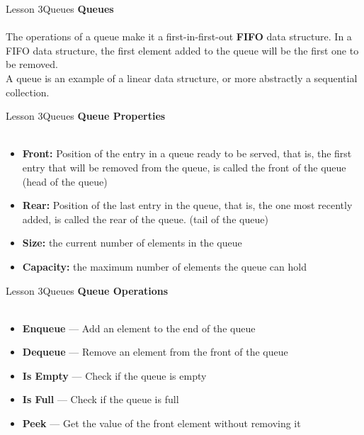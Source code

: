 \documentclass[aspectratio=1610]{beamer}
\begin{document}
\begin{frame}{Lesson 3}{Queues}
\LARGE
\textbf{Queues}\\~\\
The operations of a queue make it a first-in-first-out \textbf{FIFO}
data structure. In a FIFO data structure, the first element added to
the queue will be the first one to be removed.\\
A queue is an example of a linear data structure, or more abstractly
a sequential collection.
\end{frame}


\begin{frame}{Lesson 3}{Queues}
\LARGE
\textbf{Queue Properties}\\~\\
\Large
\begin{itemize}
\item \textbf{Front:} Position of the entry in a queue ready to be served, that is, the first entry that will be removed from the queue, is called the front of the queue (head of the queue)
\item \textbf{Rear:} Position of the last entry in the queue, that is, the one most recently added, is called the rear of the queue. (tail of the queue)
\item \textbf{Size:} the current number of elements in the queue 
\item \textbf{Capacity:} the maximum number of elements the queue can hold
\end{itemize}
\end{frame}


\begin{frame}{Lesson 3}{Queues}
\LARGE
\textbf{Queue Operations}\\~\\
\Large
\begin{itemize}
\item \textbf{Enqueue} — Add an element to the end of the queue
\item \textbf{Dequeue} — Remove an element from the front of the queue
\item \textbf{Is Empty} — Check if the queue is empty
\item \textbf{Is Full} — Check if the queue is full
\item \textbf{Peek} — Get the value of the front element without removing it
\end{itemize}
\end{frame}
\end{document}
